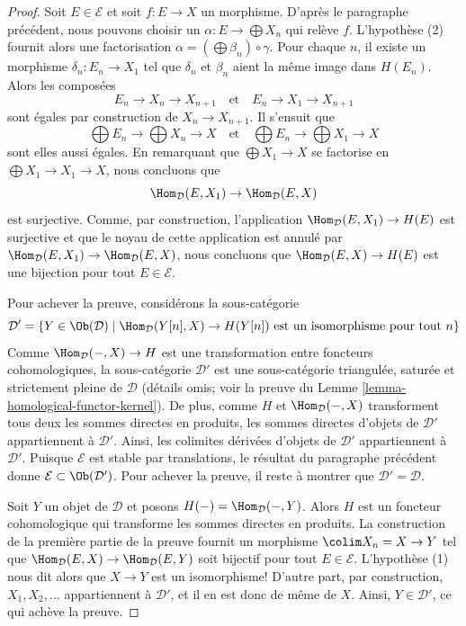 \begin{proof}
\medskip\noindent
Soit $E \in \mathcal{E}$ et soit $f : E \to X$ un morphisme.
D'après le paragraphe précédent, nous pouvons choisir un
$\alpha : E \to \bigoplus X_n$ qui relève $f$. L'hypothèse (2) fournit alors
une factorisation $\alpha = (\bigoplus \beta_n) \circ \gamma$.
Pour chaque $n$, il existe un morphisme $\delta_n : E_n \to X_1$ tel que
$\delta_n$ et $\beta_n$ aient la même image dans $H(E_n)$. Alors les composées
$$
E_n \to X_n \to X_{n + 1}
\quad\text{et}\quad
E_n \to X_1 \to X_{n + 1}
$$
sont égales par construction de $X_n \to X_{n + 1}$. Il s'ensuit que
$$
\bigoplus E_n \to \bigoplus X_n \to X
\quad\text{et}\quad
\bigoplus E_n \to \bigoplus X_1 \to X
$$
sont elles aussi égales. En remarquant que $\bigoplus X_1 \to X$ se factorise
en $\bigoplus X_1 \to X_1 \to X$, nous concluons que
$$
\Hom_\mathcal{D}(E, X_1) \to \Hom_\mathcal{D}(E, X)
$$
est surjective. Comme, par construction, l'application
$\Hom_\mathcal{D}(E, X_1) \to H(E)$ est surjective et que le noyau de cette
application est annulé par
$\Hom_\mathcal{D}(E, X_1) \to \Hom_\mathcal{D}(E, X)$, nous concluons que
$\Hom_\mathcal{D}(E, X) \to H(E)$ est une bijection pour tout
$E \in \mathcal{E}$.

\medskip\noindent
Pour achever la preuve, considérons la sous-catégorie
$$
\mathcal{D}' =
\{Y \in \Ob(\mathcal{D}) \mid \Hom_\mathcal{D}(Y[n], X) \to H(Y[n])
\text{ est un isomorphisme pour tout }n\}
$$
Comme $\Hom_\mathcal{D}(-, X) \to H$ est une transformation entre foncteurs
cohomologiques, la sous-catégorie $\mathcal{D}'$ est une sous-catégorie
triangulée, saturée et strictement pleine de $\mathcal{D}$ (détails omis;
voir la preuve du Lemme \ref{lemma-homological-functor-kernel}).
De plus, comme $H$ et $\Hom_\mathcal{D}(-, X)$ transforment tous deux les
sommes directes en produits, les sommes directes d'objets de $\mathcal{D}'$
appartiennent à $\mathcal{D}'$. Ainsi, les colimites dérivées d'objets de
$\mathcal{D}'$ appartiennent à $\mathcal{D}'$.
Puisque $\mathcal{E}$ est stable par translations, le résultat du paragraphe
précédent donne $\mathcal{E} \subset \Ob(\mathcal{D}')$.
Pour achever la preuve, il reste à montrer que
$\mathcal{D}' = \mathcal{D}$.

\medskip\noindent
Soit $Y$ un objet de $\mathcal{D}$ et posons
$H(-) = \Hom_\mathcal{D}(-, Y)$. Alors $H$ est un foncteur cohomologique qui
transforme les sommes directes en produits.
La construction de la première partie de la preuve fournit un morphisme
$\colim X_n = X \to Y$ tel que
$\Hom_\mathcal{D}(E, X) \to \Hom_\mathcal{D}(E, Y)$ soit bijectif pour tout
$E \in \mathcal{E}$. L'hypothèse (1) nous dit alors que $X \to Y$ est un
isomorphisme! D'autre part, par construction, $X_1, X_2, \ldots$ appartiennent
à $\mathcal{D}'$, et il en est donc de même de $X$. Ainsi,
$Y \in \mathcal{D}'$, ce qui achève la preuve.
\end{proof}

